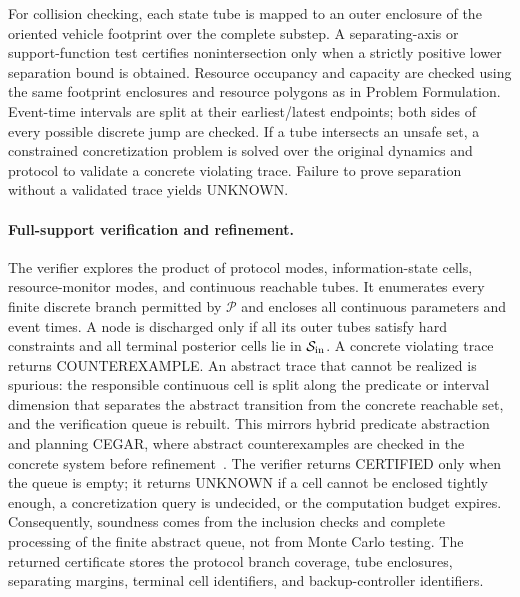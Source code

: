 \documentclass[letterpaper]{article} %
\newcommand{\Pset}{\ensuremath{\mathcal P}}
\begin{document}
For collision checking, each state tube is mapped to an outer enclosure of
the oriented vehicle footprint over the complete substep. A separating-axis
or support-function test certifies nonintersection only when a strictly
positive lower separation bound is obtained. Resource occupancy and capacity
are checked using the same footprint enclosures and resource polygons as in
Problem Formulation. Event-time intervals are split at their earliest/latest
endpoints; both sides of every possible discrete jump are checked. If a tube
intersects an unsafe set, a constrained concretization problem is solved over
the original dynamics and protocol to validate a concrete violating trace.
Failure to prove separation without a validated trace yields UNKNOWN.

\paragraph{Full-support verification and refinement.}
The verifier explores the product of protocol modes, information-state cells,
resource-monitor modes, and continuous reachable tubes. It enumerates every
finite discrete branch permitted by $\Pset$ and encloses all continuous
parameters and event times. A node is discharged only if all its outer tubes
satisfy hard constraints and all terminal posterior cells lie in
$\mathcal S_{\rm in}$. A concrete violating trace returns COUNTEREXAMPLE.
An abstract trace that cannot be realized is spurious: the responsible
continuous cell is split along the predicate or interval dimension that
separates the abstract transition from the concrete reachable set, and the
verification queue is rebuilt. This mirrors hybrid predicate abstraction and
planning CEGAR, where abstract counterexamples are checked in the concrete
system before refinement~\citep{alur2003counter,seipp2013counterexample}.
The verifier returns CERTIFIED only when the queue is empty; it returns
UNKNOWN if a cell cannot be enclosed tightly enough, a concretization query
is undecided, or the computation budget expires. Consequently, soundness
comes from the inclusion checks and complete processing of the finite
abstract queue, not from Monte Carlo testing. The returned certificate stores
the protocol branch coverage, tube enclosures, separating margins, terminal
cell identifiers, and backup-controller identifiers.
\end{document}
